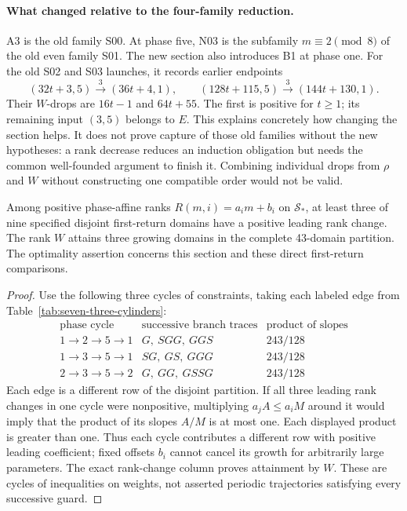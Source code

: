 \paragraph{What changed relative to the four-family reduction.}
A3 is the old family S00.  At phase five, N03 is the subfamily
$m\equiv2\pmod8$ of the old even family S01.  The new section also
introduces B1 at phase one.  For the old S02 and S03 launches, it records
earlier endpoints
\[
 (32t+3,5)\xrightarrow{3}(36t+4,1),\qquad
 (128t+115,5)\xrightarrow{3}(144t+130,1).
\]
Their $W$-drops are $16t-1$ and $64t+55$.  The first is positive for
$t\ge1$; its remaining input $(3,5)$ belongs to $E$.  This explains
concretely how changing the section helps.  It does not prove capture
of those old families without the new hypotheses: a rank decrease
reduces an induction obligation but needs the common well-founded
argument to finish it.  Combining individual drops from $\rho$ and
$W$ without constructing one compatible order would not be valid.

\begin{proposition}
\label{prop:seven-three-barrier}
Among positive phase-affine ranks
$R(m,i)=a_i m+b_i$ on $\mathcal S_*$, at least three of nine specified
disjoint first-return domains have a positive leading rank change.
The rank $W$ attains three growing domains in the complete 43-domain
partition.  The optimality assertion concerns this section and these
direct first-return comparisons.
\end{proposition}
\begin{proof}
Use the following three cycles of constraints, taking each labeled
edge from Table~\ref{tab:seven-three-cylinders}:
\[
 \begin{array}{c|c|c}
 \text{phase cycle}&\text{successive branch traces}&
       \text{product of slopes}\\\hline
 1\to2\to5\to1&G,\ SGG,\ GGS&243/128\\
 1\to3\to5\to1&SG,\ GS,\ GGG&243/128\\
 2\to3\to5\to2&G,\ GG,\ GSSG&243/128
 \end{array}
\]
Each edge is a different row of the disjoint partition.  If all three
leading rank changes in one cycle were nonpositive, multiplying
$a_jA\le a_iM$ around it would imply that the product of its slopes
$A/M$ is at most one.  Each displayed product is greater than one.
Thus each cycle contributes a different row with positive leading
coefficient; fixed offsets $b_i$ cannot cancel its growth for arbitrarily
large parameters.  The exact rank-change column proves attainment by
$W$.  These are cycles of inequalities on weights, not asserted
periodic trajectories satisfying every successive guard.
\end{proof}

